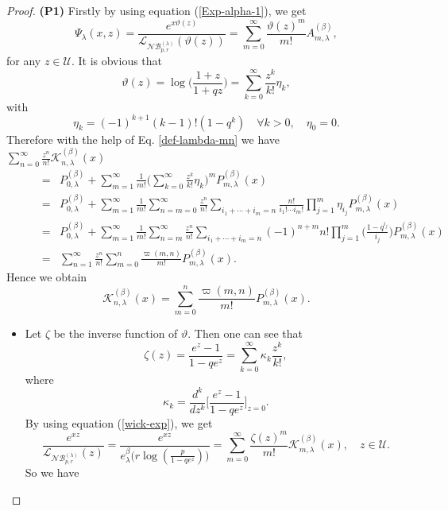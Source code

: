 \documentclass{birkjour}
\theoremstyle{definition}
\theoremstyle{remark}
\numberwithin{equation}{section}
\begin{document}
\begin{proof}
\textbf{(P1)}
Firstly by using equation (\ref{Exp-alpha-1}), we get
$$\Psi_{\lambda}(x, z)=\displaystyle{\frac{e^{x\vartheta(z)}}{\mathcal{L}_{\mathcal{NB}^{(\lambda)}_{p, r}}(\vartheta(z))}
=\sum^{\infty}_{m=0}\frac{\vartheta(z)^{m}}{m!}A^{(\beta)}_{m,
\lambda}},$$ for any $z\in \mathcal{U}$. It is obvious that
$$\vartheta(z)=\log\Big(\frac{1+z}{1+qz}\Big)=\displaystyle{\sum^{\infty}_{k=0}\frac{z^{k}}{k!}\eta_{k}},$$
with
$$
\eta_{k}=\displaystyle{(-1)^{k+1}(k-1)!(1-q^{k}) \quad\forall
k>0,\quad \eta_{0}=0}.
$$
Therefore with the help of Eq. \eqref{def-lambda-mn} we have\\

$\displaystyle{\sum^{\infty}_{n=0}\frac{z^{n}}{n!}\mathcal{K}^{(\beta)}_{n,
\lambda}(x)}$
$$\begin{array}{lll}
\qquad&=&P^{(\beta)}_{0,
\lambda}+\displaystyle{\sum^{\infty}_{m=1}\frac{1}{m!}\Big(\sum^{\infty}_{k=0}
\frac{z^{k}}{k!}\eta_{k}\Big)^{m}P^{(\beta)}_{m, \lambda}(x)}\\
&=&P^{(\beta)}_{0,
\lambda}+\displaystyle{\sum^{\infty}_{m=1}\frac{1}{m!}\sum^{\infty}_{n=m=0}\frac{z^{n}}{n!}
\sum_{i_{1}+\cdots+i_{m}=n}\frac{n!}{i_{1}!\cdots i_{m}!}\prod^{m}_{j=1}\eta_{i_{j}}P^{(\beta)}_{m, \lambda}(x)}\\
&=&P^{(\beta)}_{0,
\lambda}+\displaystyle{\sum^{\infty}_{m=1}\frac{1}{m!}\sum^{\infty}_{n=m}\frac{z^{n}}{n!}
\sum_{i_{1}+\cdots+i_{m}=n}(-1)^{n+m}n!\prod^{m}_{j=1}\Big(\frac{1-q^{i_{j}}}{i_{j}}\Big)P^{(\beta)}_{m, \lambda}(x)}\\
&=&\displaystyle{\sum^{\infty}_{n=1}\frac{z^{n}}{n!}\sum^{n}_{m=0}\frac{\varpi(m,
n)}{m!}P^{(\beta)}_{m, \lambda}(x)}.
\end{array}$$
Hence we obtain
$$\displaystyle{\mathcal{K}^{(\beta)}_{n, \lambda}(x)=\displaystyle{\sum^{n}_{m=0}
\frac{\varpi(m, n)}{m!}P^{(\beta)}_{m, \lambda}(x)}}.$$
\begin{itemize}
\item [\textbf{(P2)}]
Let $\zeta$ be the inverse function of $\vartheta$. Then one can see
that
$$\zeta(z)=\displaystyle{\frac{e^{z}-1}{1-qe^{z}}=\sum^{\infty}_{k=0}\kappa_{k}\frac{z^{k}}{k!},}$$
where
$$\kappa_{k}=\displaystyle{\frac{d^{k}}{dz^{k}}\Big[\frac{e^{z}-1}{1-qe^{z}}\Big]_{z=0}}.$$
By using equation (\ref{wick-exp}), we get
$$\displaystyle{\frac{e^{xz}}{\mathcal{L}_{\mathcal{NB}^{(\lambda)}_{p, r}}(z)}=
\frac{e^{xz}}{e^{\beta}_{\lambda}\Big(r\log(\frac{p}{1-qe^{z}})\Big)}=
\sum^{\infty}_{m=0}\frac{\zeta(z)^{m}}{m!}\mathcal{K}^{(\beta)}_{m,
\lambda}(x)},\quad z\in \mathcal{U}.$$
So we have\\


\end{itemize}
\end{proof}
\end{document}
